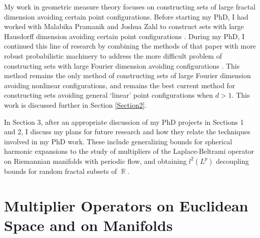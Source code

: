 \documentclass[11pt]{article}
\DeclareMathOperator{\RR}{\mathbb{R}}
\begin{document}
My work in geometric measure theory focuses on constructing sets of large fractal dimension avoiding certain point configurations. Before starting my PhD, I had worked with Malabika Pramanik and Joshua Zahl to construct sets with large Hausdorff dimension avoiding certain point configurations \cite{DensonPramanikZahl}. During my PhD, I continued this line of research by combining the methods of that paper with more robust probabilistic machinery to address the more difficult problem of constructing sets with large Fourier dimension avoiding configurations \cite{DensonFourier}. This method remains the only method of constructing sets of large Fourier dimension avoiding nonlinear configurations, and remains the best current method for constructing sets avoiding general `linear' point configurations when $d > 1$. This work is discussed further in Section \ref{Section2}.


In Section 3, after an appropriate discussion of my PhD projects in Sections 1 and 2, I discuss my plans for future research and how they relate the techniques involved in my PhD work. These include generalizing bounds for spherical harmonic expansions to the study of multipliers of the Laplace-Beltrami operator on Riemannian manifolds with periodic flow, and obtaining $l^2(L^p)$ decoupling bounds for random fractal subsets of $\RR$. %

\section{Multiplier Operators on Euclidean Space and on Manifolds} \label{Section1}

\end{document}
